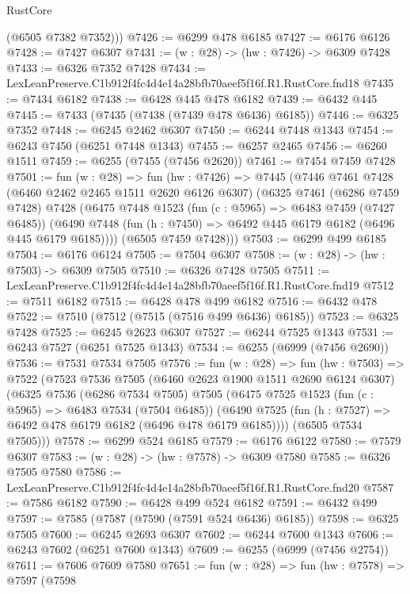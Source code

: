 \begin{lexlean}{RustCore}
\begin{coremodule}
        (@6505 @7382 @7352)))
@7426 := @6299 @478 @6185
@7427 := @6176 @6126
@7428 := @7427 @6307
@7431 := (w : @28) -> (hw : @7426) -> @6309 @7428
@7433 := @6326 @7352 @7428
@7434 := LexLeanPreserve.C1b912f4fc4d4e14a28bfb70aeef5f16f.R1.RustCore.fnd18
@7435 := @7434 @6182
@7438 := @6428 @445 @478 @6182
@7439 := @6432 @445
@7445 := @7433 (@7435 (@7438 (@7439 @478 @6436) @6185))
@7446 := @6325 @7352
@7448 := @6245 @2462 @6307
@7450 := @6244 @7448 @1343
@7454 := @6243 @7450 (@6251 @7448 @1343)
@7455 := @6257 @2465
@7456 := @6260 @1511
@7459 := @6255 (@7455 (@7456 @2620))
@7461 := @7454 @7459 @7428
@7501 := fun (w : @28) =>
  fun (hw : @7426) =>
  @7445
    (@7446
      @7461
      @7428
      (@6460 @2462 @2465 @1511 @2620 @6126 @6307)
      (@6325
        @7461
        (@6286 @7459 @7428)
        @7428
        (@6475
          @7448
          @1523
          (fun (c : @5965) => @6483 @7459 (@7427 @6485))
          (@6490 @7448 (fun (h : @7450) => @6492 @445 @6179 @6182 (@6496 @445 @6179 @6185))))
        (@6505 @7459 @7428)))
@7503 := @6299 @499 @6185
@7504 := @6176 @6124
@7505 := @7504 @6307
@7508 := (w : @28) -> (hw : @7503) -> @6309 @7505
@7510 := @6326 @7428 @7505
@7511 := LexLeanPreserve.C1b912f4fc4d4e14a28bfb70aeef5f16f.R1.RustCore.fnd19
@7512 := @7511 @6182
@7515 := @6428 @478 @499 @6182
@7516 := @6432 @478
@7522 := @7510 (@7512 (@7515 (@7516 @499 @6436) @6185))
@7523 := @6325 @7428
@7525 := @6245 @2623 @6307
@7527 := @6244 @7525 @1343
@7531 := @6243 @7527 (@6251 @7525 @1343)
@7534 := @6255 (@6999 (@7456 @2690))
@7536 := @7531 @7534 @7505
@7576 := fun (w : @28) =>
  fun (hw : @7503) =>
  @7522
    (@7523
      @7536
      @7505
      (@6460 @2623 @1900 @1511 @2690 @6124 @6307)
      (@6325
        @7536
        (@6286 @7534 @7505)
        @7505
        (@6475
          @7525
          @1523
          (fun (c : @5965) => @6483 @7534 (@7504 @6485))
          (@6490 @7525 (fun (h : @7527) => @6492 @478 @6179 @6182 (@6496 @478 @6179 @6185))))
        (@6505 @7534 @7505)))
@7578 := @6299 @524 @6185
@7579 := @6176 @6122
@7580 := @7579 @6307
@7583 := (w : @28) -> (hw : @7578) -> @6309 @7580
@7585 := @6326 @7505 @7580
@7586 := LexLeanPreserve.C1b912f4fc4d4e14a28bfb70aeef5f16f.R1.RustCore.fnd20
@7587 := @7586 @6182
@7590 := @6428 @499 @524 @6182
@7591 := @6432 @499
@7597 := @7585 (@7587 (@7590 (@7591 @524 @6436) @6185))
@7598 := @6325 @7505
@7600 := @6245 @2693 @6307
@7602 := @6244 @7600 @1343
@7606 := @6243 @7602 (@6251 @7600 @1343)
@7609 := @6255 (@6999 (@7456 @2754))
@7611 := @7606 @7609 @7580
@7651 := fun (w : @28) =>
  fun (hw : @7578) =>
  @7597
    (@7598

\end{coremodule}
\end{lexlean}
